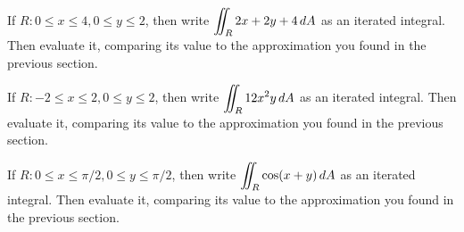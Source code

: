 \documentclass[letterpaper, twoside, 12pt]{book}
\begin{document}
          \begin{problem}
            If $R : 0\leq x\leq 4, 0\leq y\leq 2 $, then write
            $\displaystyle\iint_R 2x+2y+4 \,d{A}$
            as an iterated integral. Then evaluate it, comparing its
            value to the approximation you found in the previous section.
          \end{problem}

          \begin{solution}

          \end{solution}

          \begin{contributors}
          \end{contributors}

          \begin{problem}
            If $R : -2\leq x\leq 2, 0\leq y\leq 2 $, then write
            $\displaystyle\iint_R 12x^2y\,d{A}$
            as an iterated integral. Then evaluate it, comparing its
            value to the approximation you found in the previous section.
          \end{problem}

          \begin{solution}

          \end{solution}

          \begin{contributors}
          \end{contributors}

          \begin{problem}
            If $R : 0\leq x\leq \pi/2, 0\leq y\leq \pi/2 $, then write
            $\displaystyle\iint_R \cos(x+y)\,d{A}$
            as an iterated integral. Then evaluate it, comparing its
            value to the approximation you found in the previous section.
          \end{problem}

          \begin{solution}

          \end{solution}

          \begin{contributors}
          \end{contributors}
\end{document}
